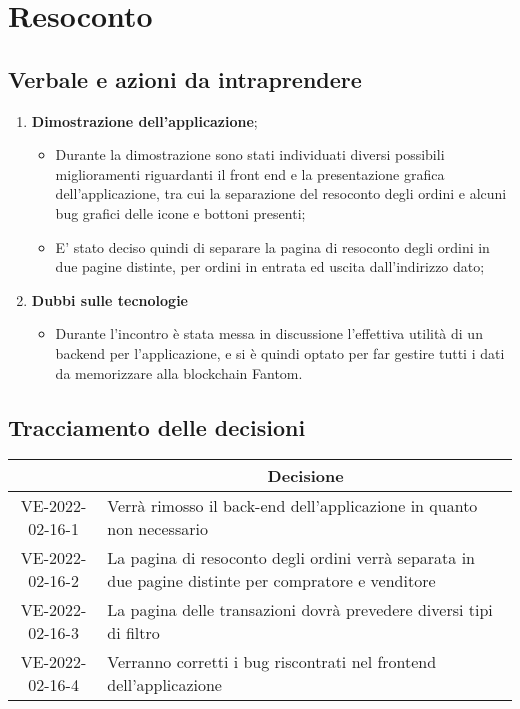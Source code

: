 \section{Resoconto}
\subsection{Verbale e azioni da intraprendere}

\begin{enumerate}
	\item \textbf{Dimostrazione dell'applicazione};
	\begin{itemize}
		\item Durante la dimostrazione sono stati individuati diversi possibili miglioramenti riguardanti
		 il front end e la presentazione grafica dell'applicazione, tra cui la separazione del 
		 resoconto degli ordini e alcuni bug grafici delle icone e bottoni presenti;
		\item E' stato deciso quindi di separare la pagina di resoconto degli ordini in due pagine distinte, per ordini in entrata ed uscita dall'indirizzo dato;
	\end{itemize}
	\item \textbf{Dubbi sulle tecnologie}
	\begin{itemize}
		\item Durante l'incontro è stata messa in discussione l'effettiva 
		utilità di un backend per l'applicazione, e si è quindi optato per far
		 gestire tutti i dati da memorizzare alla blockchain Fantom.
	\end{itemize}
\end{enumerate}

\pagebreak

\subsection{Tracciamento delle decisioni}

\begin{table}[H]
	\centering
	\renewcommand{\arraystretch}{1.8}
	\begin{tabular}{c | p{10cm}}
		\rowcolor[HTML]{125E28}
		\multicolumn{1}{c}{\color[HTML]{FFFFFF} \textbf{ID}} &
		\multicolumn{1}{c}{\color[HTML]{FFFFFF} \textbf{Decisione}} \\
		\hline
		VE-2022-02-16-1 & Verrà rimosso il back-end dell'applicazione in quanto non necessario \\ \hline
		VE-2022-02-16-2 & La pagina di resoconto degli ordini verrà separata in due pagine distinte per compratore e venditore \\ \hline
		VE-2022-02-16-3 & La pagina delle transazioni dovrà prevedere diversi tipi di filtro \\ \hline
		VE-2022-02-16-4 & Verranno corretti i bug riscontrati nel frontend dell'applicazione \\
	\end{tabular}
\end{table}